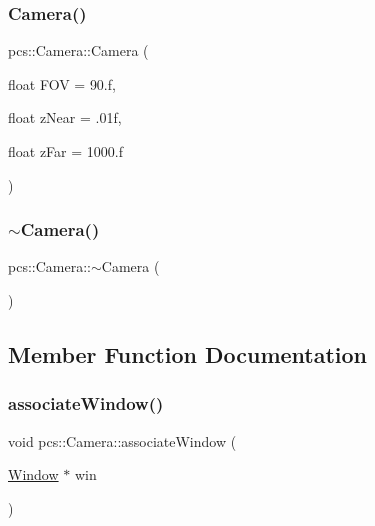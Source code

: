 \subsubsection{\texorpdfstring{Camera()}{Camera()}}
{\footnotesize\ttfamily pcs\+::\+Camera\+::\+Camera (\begin{DoxyParamCaption}\item[{float}]{F\+OV = {\ttfamily 90.f},  }\item[{float}]{z\+Near = {\ttfamily .01f},  }\item[{float}]{z\+Far = {\ttfamily 1000.f} }\end{DoxyParamCaption})}

\mbox{\label{classpcs_1_1Camera_ad46170506d099a71fd7f025a82405310}} 
\subsubsection{\texorpdfstring{$\sim$\+Camera()}{~Camera()}}
{\footnotesize\ttfamily pcs\+::\+Camera\+::$\sim$\+Camera (\begin{DoxyParamCaption}{ }\end{DoxyParamCaption})\hspace{0.3cm}{\ttfamily [inline]}}



\subsection{Member Function Documentation}
\mbox{\label{classpcs_1_1Camera_af43d459cebd61a86a492d632e2b4bd14}} 
\subsubsection{\texorpdfstring{associate\+Window()}{associateWindow()}}
{\footnotesize\ttfamily void pcs\+::\+Camera\+::associate\+Window (\begin{DoxyParamCaption}\item[{\hyperlink{classpcs_1_1Window}{Window} $\ast$}]{win }\end{DoxyParamCaption})}

